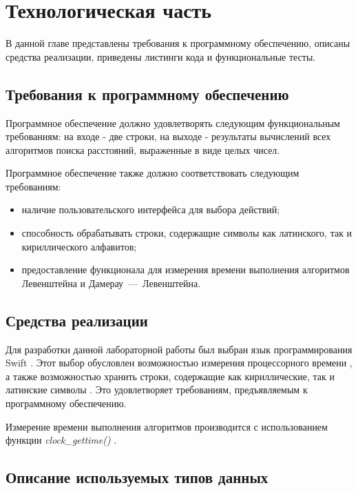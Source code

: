 \chapter{Технологическая часть}

В данной главе представлены требования к программному обеспечению, описаны средства реализации, приведены листинги кода и функциональные тесты.

\section{Требования к программному обеспечению}\label{section:requirements}

Программное обеспечение должно удовлетворять следующим функциональным требованиям: на входе - две строки, на выходе - результаты вычислений всех алгоритмов поиска расстояний, выраженные в виде целых чисел.

Программное обеспечение также должно соответствовать следующим требованиям:
\begin{itemize}[label=---]
	\item наличие пользовательского интерфейса для выбора действий;
	\item способность обрабатывать строки, содержащие символы как латинского, так и кириллического алфавитов;
	\item предоставление функционала для измерения времени выполнения алгоритмов Левенштейна и Дамерау~---~Левенштейна.
\end{itemize}

\section{Средства реализации}

Для разработки данной лабораторной работы был выбран язык программирования Swift \cite{swift}. 
Этот выбор обусловлен возможностью измерения процессорного времени \cite{cpu-time-measure}, а также возможностью хранить строки, содержащие как кириллические, так и латинские символы \cite{string}. 
Это удовлетворяет требованиям, предъявляемым к программному обеспечению.

Измерение времени выполнения алгоритмов производится с использованием функции \textit{clock\_gettime()} \cite{cpu-time-measure}.


\section{Описание используемых типов данных}

